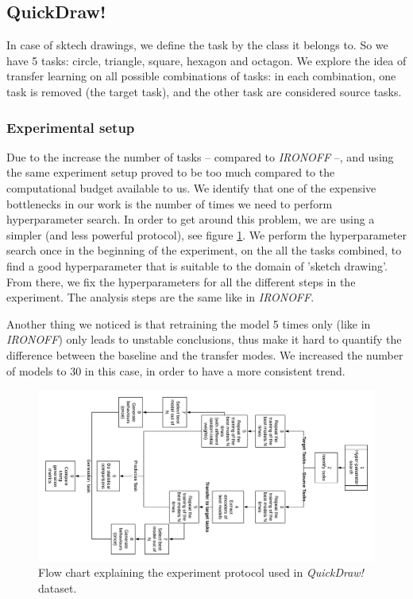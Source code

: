   \subsection{QuickDraw!}
    \par In case of sktech drawings, we define the task by the class it belongs to. So we have 5 tasks: circle, triangle, square, hexagon and octagon. We explore the idea of transfer learning on all possible combinations of tasks: in each combination, one task is removed (the target task), and the other task are considered source tasks.

    \subsubsection{Experimental setup}
    \par Due to the increase the number of tasks -- compared to \textit{IRONOFF} --, and using the same experiment setup proved to be too much compared to the computational budget available to us. We identify that one of the expensive bottlenecks in our work is the number of times we need to perform hyperparameter search. In order to get around this problem, we are using a simpler (and less powerful protocol), see figure \ref{fig:quickdraw_protocol}. We perform the hyperparameter search once in the beginning of the experiment, on the all the tasks combined, to find a good hyperparameter that is suitable to the domain of 'sketch drawing'. From there, we fix the hyperparameters for all the different steps in the experiment. The analysis steps are the same like in \textit{IRONOFF}.

    Another thing we noticed is that retraining the model 5 times only (like in \textit{IRONOFF}) only leads to unstable conclusions, thus make it hard to quantify the difference between the baseline and the transfer modes. We increased the number of models to 30 in this case, in order to have a more consistent trend.

    \begin{figure}
      \includegraphics[scale=0.3]{images/sota/quickdraw_results/QuickDraw_transfer_learning_flow.png}
      \caption{Flow chart explaining the experiment protocol used in \textit{QuickDraw!} dataset.}
      \label{fig:quickdraw_protocol}
    \end{figure}

